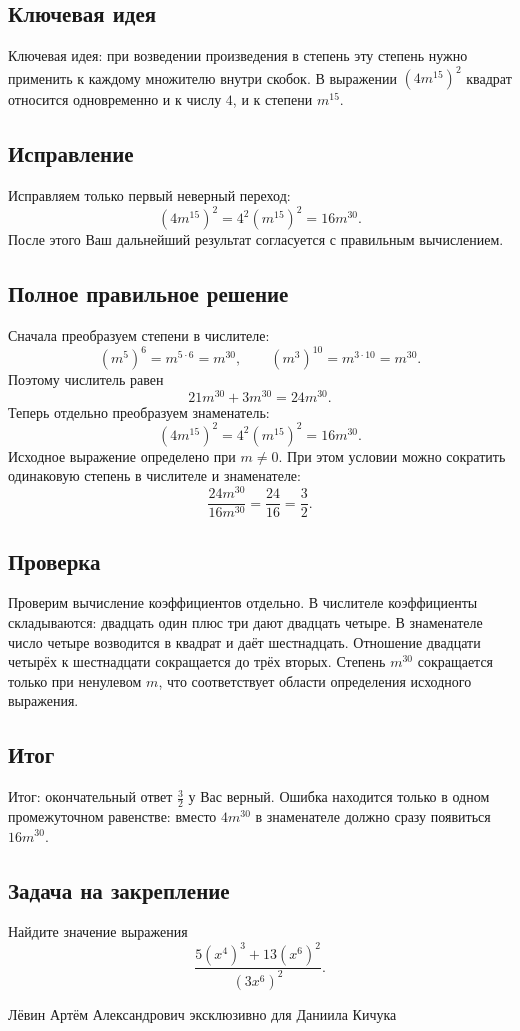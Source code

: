 \documentclass[12pt,a4paper]{article}
\begin{document}
\subsection*{Ключевая идея}
\textcolor{blue!60!black}{Ключевая идея:} при возведении произведения в степень эту степень нужно применить к каждому множителю внутри скобок. В выражении $(4m^{15})^2$ квадрат относится одновременно и к числу $4$, и к степени $m^{15}$.

\subsection*{Исправление}
Исправляем только первый неверный переход:
\[
(4m^{15})^2=4^2(m^{15})^2=16m^{30}.
\]
После этого Ваш дальнейший результат согласуется с правильным вычислением.

\subsection*{Полное правильное решение}
Сначала преобразуем степени в числителе:
\[
(m^5)^6=m^{5\cdot 6}=m^{30},
\qquad
(m^3)^{10}=m^{3\cdot 10}=m^{30}.
\]
Поэтому числитель равен
\[
21m^{30}+3m^{30}=24m^{30}.
\]
Теперь отдельно преобразуем знаменатель:
\[
(4m^{15})^2=4^2(m^{15})^2=16m^{30}.
\]
Исходное выражение определено при $m\ne 0$. При этом условии можно сократить одинаковую степень в числителе и знаменателе:
\[
\frac{24m^{30}}{16m^{30}}
=
\frac{24}{16}
=
\frac{3}{2}.
\]

\subsection*{Проверка}
Проверим вычисление коэффициентов отдельно. В числителе коэффициенты складываются: двадцать один плюс три дают двадцать четыре. В знаменателе число четыре возводится в квадрат и даёт шестнадцать. Отношение двадцати четырёх к шестнадцати сокращается до трёх вторых. Степень $m^{30}$ сокращается только при ненулевом $m$, что соответствует области определения исходного выражения.

\subsection*{Итог}
\textcolor{teal!60!black}{Итог:} окончательный ответ $\frac{3}{2}$ у Вас верный. Ошибка находится только в одном промежуточном равенстве: вместо $4m^{30}$ в знаменателе должно сразу появиться $16m^{30}$.

\subsection*{Задача на закрепление}
Найдите значение выражения
\[
\frac{5(x^4)^3+13(x^6)^2}{(3x^6)^2}.
\]

\vfill
\begin{center}
\small Лёвин Артём Александрович эксклюзивно для Даниила Кичука
\end{center}
\end{document}
